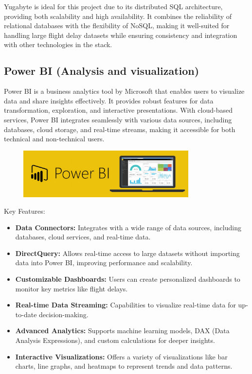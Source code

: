 \documentclass[12pt,a4paper]{article}
\begin{document}
Yugabyte is ideal for this project due to its distributed SQL architecture,
providing both scalability and high availability. It combines the reliability of
relational databases with the flexibility of NoSQL, making it well-suited for
handling large flight delay datasets while ensuring consistency and integration
with other technologies in the stack.

\subsection{Power BI (Analysis and visualization)}
Power BI is a business analytics tool by Microsoft that enables users to visualize data and share insights effectively. It provides robust features for data transformation, exploration, and interactive presentations. With cloud-based services, Power BI integrates seamlessly with various data sources, including databases, cloud storage, and real-time streams, making it accessible for both technical and non-technical users.
\begin{figure}[H]
    \begin{center}
        \includegraphics[width=0.8\textwidth]{Images/powerBI.png}
    \end{center}
\end{figure}

Key Features:
\begin{itemize}
    \item \textbf{Data Connectors:} Integrates with a wide range of data
    sources, including databases, cloud services, and real-time data.
    \item \textbf{DirectQuery:} Allows real-time access to large datasets
    without importing data into Power BI, improving performance and scalability.
    \item \textbf{Customizable Dashboards:} Users can create personalized
    dashboards to monitor key metrics like flight delays.
    \item \textbf{Real-time Data Streaming:} Capabilities to visualize real-time
    data for up-to-date decision-making.
    \item \textbf{Advanced Analytics:} Supports machine learning models, DAX
    (Data Analysis Expressions), and custom calculations for deeper insights.
    \item \textbf{Interactive Visualizations:} Offers a variety of
    visualizations like bar charts, line graphs, and heatmaps to represent
    trends and data patterns.
\end{itemize}
\end{document}
